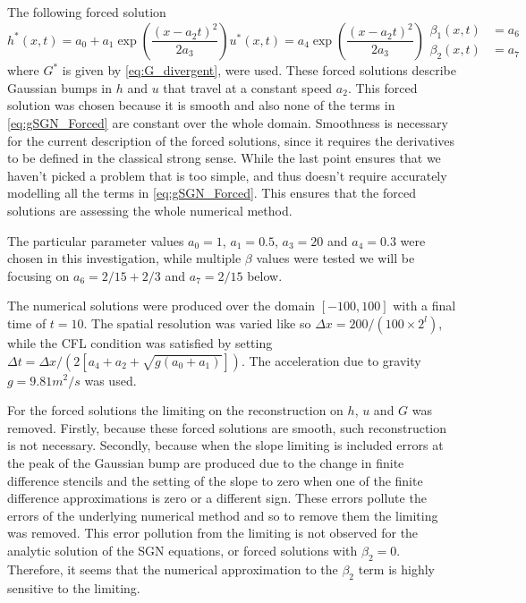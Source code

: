 \documentclass[10pt]{elsarticle}
\begin{document}
The following forced solution
\begin{subequations}
	\begin{equation}
	h^*(x,t) = a_0 + a_1 \exp\left( \dfrac{\left(x - a_2 t\right)^2}{2 a_3} \right)
	\end{equation}
	\begin{equation}
	u^*(x,t) = a_4 \exp\left( \dfrac{\left(x - a_2 t\right)^2}{2 a_3} \right)
	\end{equation}
	\begin{align}
	\beta_1(x,t) &= a_6 \\
	\beta_2(x,t) &= a_7
	\end{align}
\end{subequations}
where $G^*$ is given by \eqref{eq:G_divergent}, were used. These forced solutions describe Gaussian bumps in $h$ and $u$ that travel at a constant speed $a_2$. This forced solution was chosen because it is smooth and also none of the terms in \eqref{eq:gSGN_Forced} are constant over the whole domain. Smoothness is necessary for the current description of the forced solutions, since it requires the derivatives to be defined in the classical strong sense. While the last point ensures that we haven't picked a problem that is too simple, and thus doesn't require accurately modelling all the terms in \eqref{eq:gSGN_Forced}. This ensures that the forced solutions are assessing the whole numerical method. 

The particular parameter values $a_0=1$, $a_1=0.5$, $a_3=20$ and $a_4=0.3$ were chosen in this investigation, while multiple $\beta$ values were tested we will be focusing on $a_6 = 2/15 + 2/3$ and $a_7=2/15$ below. 

The numerical solutions were produced over the domain $\left[-100,100\right]$ with a final time of $t=10$. The spatial resolution was varied like so $\Delta x = 200 / (100 \times 2^{l})$, while the CFL condition was satisfied by setting $\Delta t = \Delta x  / \left( 2 \left[a_4 + a_2+ \sqrt{g \left(a_0 + a_1\right)}\right] \right)$. The acceleration due to gravity $g=9.81m^2/s$ was used. 

For the forced solutions the limiting on the reconstruction on $h$, $u$ and $G$ was removed. Firstly, because these forced solutions are smooth, such reconstruction is not necessary. Secondly, because when the slope limiting is included errors at the peak of the Gaussian bump are produced due to the change in finite difference stencils and the setting of the slope to zero when one of the finite difference approximations is zero or a different sign. These errors pollute the errors of the underlying numerical method and so to remove them the limiting was removed. This error pollution from the limiting is not observed for the analytic solution of the SGN equations, or forced solutions with $\beta_2 =0$. Therefore, it seems that the numerical approximation to the $\beta_2$ term is highly sensitive to the limiting. 
\end{document}
